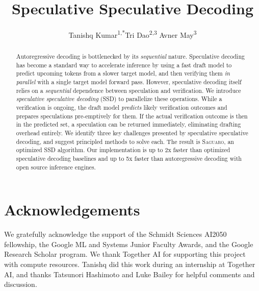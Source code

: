 \documentclass[11pt]{article}
\title{Speculative Speculative Decoding}
\author[ ]{\normalsize
    Tanishq Kumar\textsuperscript{1,*}\quad Tri Dao\textsuperscript{2,3} \quad Avner May\textsuperscript{3}
}
\affil[1]{Department of Computer Science, Stanford University}
\affil[2]{Department of Computer Science, Princeton University}
\affil[3]{Together AI}
\date{}
\newcommand{\Sys}{\textsc{Saguaro}\xspace}
\begin{document}
\maketitle
\enlargethispage{2\baselineskip}
\begingroup\renewcommand\thefootnote{*}\endgroup\setcounter{footnote}{0}%
\vspace{-30pt}

\begin{abstract}

Autoregressive decoding is bottlenecked by its \textit{sequential} nature.
Speculative decoding has become a standard way to accelerate inference by using a fast draft model to predict upcoming tokens from a slower target model, and then verifying them \textit{in parallel} with a single target model forward pass.
However, speculative decoding itself relies on a \textit{sequential} dependence between speculation and verification.
We introduce \textit{speculative speculative decoding} (SSD) to parallelize these operations.
While a verification is ongoing, the draft model \textit{predicts} likely verification outcomes and prepares speculations pre-emptively for them.
If the actual verification outcome is then in the predicted set, a speculation can be returned immediately, eliminating drafting overhead entirely.
We identify three key challenges presented by speculative speculative decoding, and suggest principled methods to solve each.
The result is \Sys, an optimized SSD algorithm. Our implementation is
 up to 2x faster than optimized speculative decoding
 baselines and up to 5x faster than
  autoregressive decoding with open source inference engines.
\end{abstract}

\vspace{-0.1cm}








\newpage 

\section*{Acknowledgements}
We gratefully acknowledge the support of the Schmidt Sciences AI2050 fellowship, the Google ML and Systems Junior Faculty Awards, and the Google Research Scholar program.
We thank Together AI for supporting this project with compute resources. Tanishq did this work during an internship at Together AI, and thanks Tatsunori Hashimoto and Luke Bailey for helpful comments and discussion. 





\end{document}
